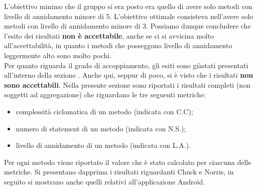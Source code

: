 				L'obiettivo minimo che il gruppo si era posto era quello di avere solo metodi con livello di annidamento minore di 5. L'obiettivo ottimale consisteva nell'avere solo metodi con livello di annidamento minore di 3. Possiamo dunque concludere che l'esito dei risultati \textbf{non è accettabile}, anche se ci si avvicina molto all'accettabilità, in quanto i metodi che posseggono livello di annidamento leggermente alto sono molto pochi.\\
				Per quanto riguarda il grado di accoppiamento, gli esiti sono giàstati presentati all'interno della sezione . Anche qui, seppur di poco, si è visto che i risultati \textbf{non sono accettabili}.
				Nella presente sezione sono riportati i risultati completi (non soggetti ad aggregazione) che riguardano le tre seguenti metriche:
				\begin{itemize}
					\item complessità ciclomatica di un metodo (indicata con C.C);
					\item numero di statement di un metodo (indicata con N.S.);
					\item livello di annidamento di un metodo (indicata con L.A.).
				\end{itemize}
				Per ogni metodo viene riportato il valore che è stato calcolato per ciascuna delle metriche. Si presentano dapprima i risultati riguardanti Chuck e Norris, in seguito si mostrano anche quelli relativi all'applicazione Android.\\
				
				

